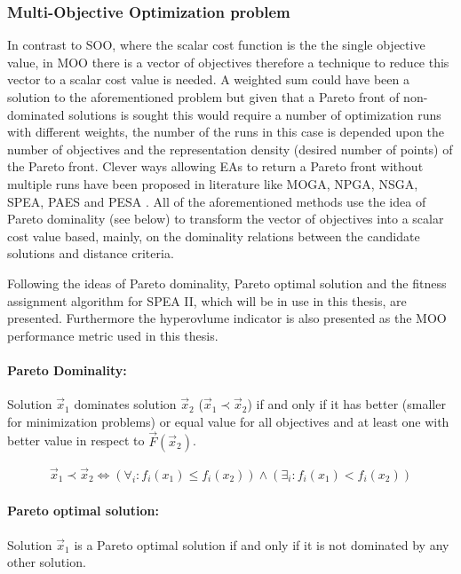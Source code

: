 \subsubsection{Multi-Objective Optimization problem}
In contrast to SOO, where the scalar cost function is the the single objective value, in MOO there is a vector of objectives therefore a technique to reduce this vector to a scalar cost value is needed. A weighted sum could have been a solution to the aforementioned problem but given that a Pareto front of non-dominated solutions is sought this would require a number of optimization runs with different weights, the number of the runs in this case is depended upon the number of objectives and the representation density (desired number of points) of the Pareto front. Clever ways allowing EAs to return a Pareto front without multiple runs have been proposed in literature like MOGA, NPGA, NSGA, SPEA, PAES and PESA \cite{CoCo99,coe02,Miett99}. All of the aforementioned methods use the idea of Pareto dominality (see below) to transform the vector of objectives into a scalar cost value based, mainly, on the dominality relations between the candidate solutions and distance criteria.     

Following the ideas of Pareto dominality, Pareto optimal solution and the fitness assignment algorithm for SPEA II, which will be in use in this thesis, are presented. Furthermore the hyperovlume indicator is also presented as the MOO performance metric used in this thesis. 

\paragraph{Pareto Dominality:} Solution $\vec{x}_1$ dominates solution $\vec{x}_2$ ($\vec{x}_1\prec\vec{x}_2$) if and only if it has better (smaller for minimization problems) or equal value for all objectives and at least one with better value in respect to $\vec{F}(\vec{x}_2)$.

\begin{eqnarray}
    \vec{x}_1\prec\vec{x}_2 \Leftrightarrow (\forall _i :  f_i(x_1) \leq f_i(x_2))\wedge (\exists _i : f_i(x_1) < f_i(x_2))
   \label{pareto_eq} 
\end{eqnarray}

\paragraph{Pareto optimal solution:} Solution  $\vec{x}_1$ is a Pareto optimal solution if and only if it is not dominated by any other solution.%


